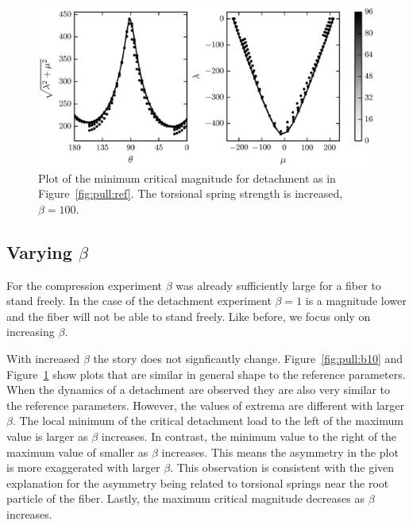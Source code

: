 	\begin{figure}[t]
		\begin{center}
			\includegraphics{./fig/ch3/pull/b100/grid.eps}
		\end{center}		
		\caption{Plot of the minimum critical magnitude for detachment as in Figure~\ref{fig:pull:ref}. The torsional spring strength is increased, $\beta=100$.
		\label{fig:pull:b100}}
	\end{figure}
	
\subsection{Varying $\beta$}

For the compression experiment $\beta$ was already sufficiently large for a fiber to stand freely. In the case of the detachment experiment $\beta=1$ is a magnitude lower and the fiber will not be able to stand freely. Like before, we focus only on increasing $\beta$.

With increased $\beta$ the story does not signficantly change. Figure~\ref{fig:pull:b10} and Figure~\ref{fig:pull:b100} show plots that are similar in general shape to the reference parameters. When the dynamics of a detachment are observed they are also very similar to the reference parameters. However, the values of extrema are different with larger $\beta$. The local minimum of the critical detachment load to the left of the maximum value is larger as $\beta$ increases. In contrast, the minimum value to the right of the maximum value of smaller as $\beta$ increases. This means the asymmetry in the plot is more exaggerated with larger $\beta$. This observation is consistent with the given explanation for the asymmetry being related to torsional springs near the root particle of the fiber. Lastly, the maximum critical magnitude decreases as $\beta$ increases.

